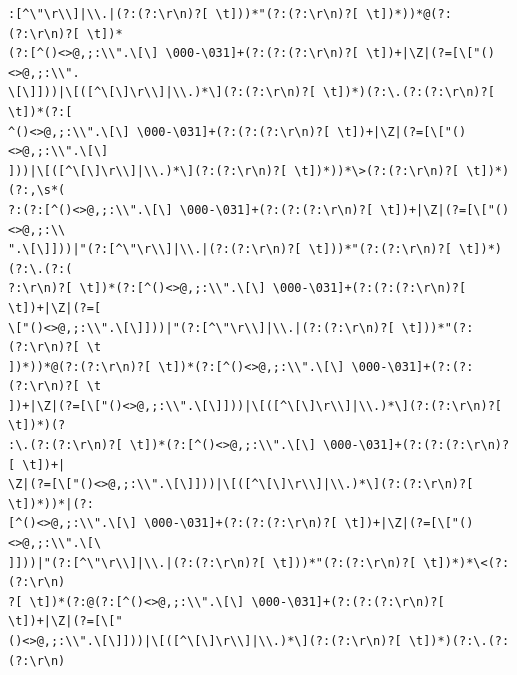 \documentclass[]{book}
\begin{document}
\begin{verbatim}
:[^\"\r\\]|\\.|(?:(?:\r\n)?[ \t]))*"(?:(?:\r\n)?[ \t])*))*@(?:(?:\r\n)?[ \t])*
(?:[^()<>@,;:\\".\[\] \000-\031]+(?:(?:(?:\r\n)?[ \t])+|\Z|(?=[\["()<>@,;:\\".
\[\]]))|\[([^\[\]\r\\]|\\.)*\](?:(?:\r\n)?[ \t])*)(?:\.(?:(?:\r\n)?[ \t])*(?:[
^()<>@,;:\\".\[\] \000-\031]+(?:(?:(?:\r\n)?[ \t])+|\Z|(?=[\["()<>@,;:\\".\[\]
]))|\[([^\[\]\r\\]|\\.)*\](?:(?:\r\n)?[ \t])*))*\>(?:(?:\r\n)?[ \t])*)(?:,\s*(
?:(?:[^()<>@,;:\\".\[\] \000-\031]+(?:(?:(?:\r\n)?[ \t])+|\Z|(?=[\["()<>@,;:\\
".\[\]]))|"(?:[^\"\r\\]|\\.|(?:(?:\r\n)?[ \t]))*"(?:(?:\r\n)?[ \t])*)(?:\.(?:(
?:\r\n)?[ \t])*(?:[^()<>@,;:\\".\[\] \000-\031]+(?:(?:(?:\r\n)?[ \t])+|\Z|(?=[
\["()<>@,;:\\".\[\]]))|"(?:[^\"\r\\]|\\.|(?:(?:\r\n)?[ \t]))*"(?:(?:\r\n)?[ \t
])*))*@(?:(?:\r\n)?[ \t])*(?:[^()<>@,;:\\".\[\] \000-\031]+(?:(?:(?:\r\n)?[ \t
])+|\Z|(?=[\["()<>@,;:\\".\[\]]))|\[([^\[\]\r\\]|\\.)*\](?:(?:\r\n)?[ \t])*)(?
:\.(?:(?:\r\n)?[ \t])*(?:[^()<>@,;:\\".\[\] \000-\031]+(?:(?:(?:\r\n)?[ \t])+|
\Z|(?=[\["()<>@,;:\\".\[\]]))|\[([^\[\]\r\\]|\\.)*\](?:(?:\r\n)?[ \t])*))*|(?:
[^()<>@,;:\\".\[\] \000-\031]+(?:(?:(?:\r\n)?[ \t])+|\Z|(?=[\["()<>@,;:\\".\[\
]]))|"(?:[^\"\r\\]|\\.|(?:(?:\r\n)?[ \t]))*"(?:(?:\r\n)?[ \t])*)*\<(?:(?:\r\n)
?[ \t])*(?:@(?:[^()<>@,;:\\".\[\] \000-\031]+(?:(?:(?:\r\n)?[ \t])+|\Z|(?=[\["
()<>@,;:\\".\[\]]))|\[([^\[\]\r\\]|\\.)*\](?:(?:\r\n)?[ \t])*)(?:\.(?:(?:\r\n)

\end{verbatim}
\end{document}
